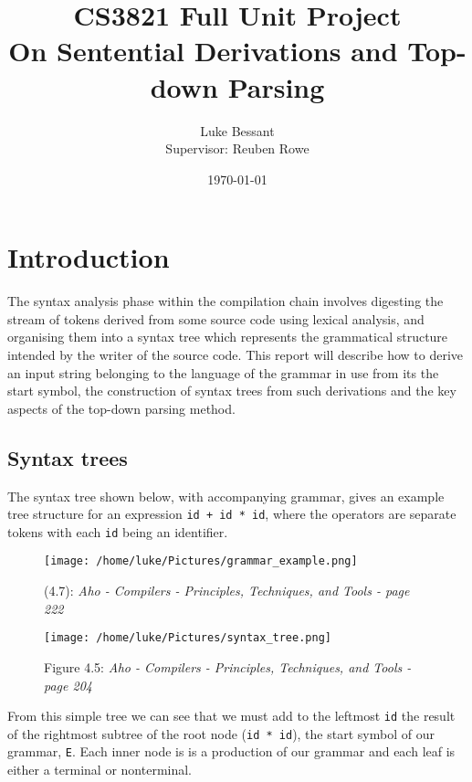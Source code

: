 \documentclass[a4paper, 11pt]{article}
\title{\textbf{CS3821 Full Unit Project}\\On Sentential Derivations and Top-down Parsing}
\author{Luke Bessant\\Supervisor: Reuben Rowe}
\date{\today}
\begin{document}
\maketitle
\thispagestyle{title}
\newpage

\tableofcontents
\newpage

\section{Introduction}
The syntax analysis phase within the compilation chain involves digesting the stream of tokens derived from some source code using lexical analysis, and organising them into a syntax tree which represents the grammatical structure intended by the writer of the source code. This report will describe how to derive an input string belonging to the language of the grammar in use from its the start symbol, the construction of syntax trees from such derivations and the key aspects of the top-down parsing method.

\subsection{Syntax trees}
The syntax tree shown below, with accompanying grammar, gives an example tree structure for an expression \texttt{id + id * id}, where the operators are separate tokens with each \texttt{id} being an identifier.

\begin{figure}[ht!]
	\centering
	\texttt{[image: /home/luke/Pictures/grammar\_example.png]}
	{\caption*{(4.7): \textit{Aho - Compilers - Principles, Techniques, and Tools - page 222}} \label{overflow}}
\end{figure}

\begin{figure}[ht!]
	\centering
	\texttt{[image: /home/luke/Pictures/syntax\_tree.png]}
	{\caption*{Figure 4.5: \textit{Aho - Compilers - Principles, Techniques, and Tools - page 204}} 
	\label{overflow}}
\end{figure}

From this simple tree we can see that we must add to the leftmost \texttt{id} the result of the rightmost subtree of the root node (\texttt{id * id}), the start symbol of our grammar, \texttt{E}. Each inner node is is a production of our grammar and each leaf is either a terminal or nonterminal.

\newpage
\end{document}
